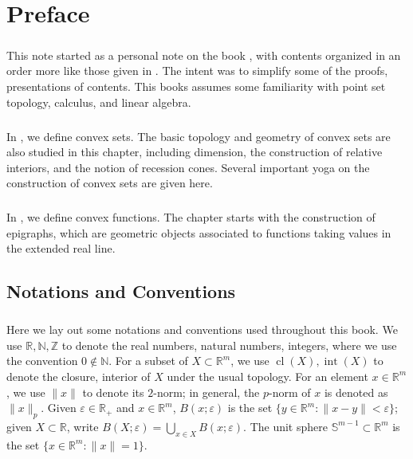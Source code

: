 \chapter*{Preface}

\paragraph{}This note started as a personal note on the book \cite{bertsekas2009convex}, with contents organized in an order more like those given in \cite{rockafellar+1970}. The intent was to simplify some of the proofs, presentations of contents. This books assumes some familiarity with point set topology, calculus, and linear algebra.

\paragraph{}In , we define convex sets. The basic topology and geometry of convex sets are also studied in this chapter, including dimension, the construction of relative interiors, and the notion of recession cones. Several important yoga on the construction of convex sets are given here.

\paragraph{}In , we define convex functions. The chapter starts with the construction of epigraphs, which are geometric objects associated to functions taking values in the extended real line.

\section*{Notations and Conventions}

\paragraph{}Here we lay out some notations and conventions used throughout this book. We use $\mathbb{R,N,Z}$ to denote the real numbers, natural numbers, integers, where we use the convention $0\notin \mathbb{N}$. For a subset of $X\subset \mathbb{R}^m$, we use $\operatorname{cl}(X),\operatorname{int}(X)$ to denote the closure, interior of $X$ under the usual topology. For an element $x\in \mathbb{R}^m$, we use $\|x\|$ to denote its $2$-norm; in general, the $p$-norm of $x$ is denoted as $\|x\|_p$. Given $\varepsilon \in \mathbb{R}_{+}$ and $x\in \mathbb{R}^m$, $B(x;\varepsilon )$ is the set $\{y\in \mathbb{R}^m:\|x-y\|<\varepsilon \}$; given $X\subset \mathbb{R}$, write $B(X;\varepsilon )=\bigcup_{x\in X}B(x;\varepsilon )$. The unit sphere $\mathbb{S}^{m-1}\subset \mathbb{R}^m$ is the set $\{x\in \mathbb{R}^m:\|x\|=1\}$.

